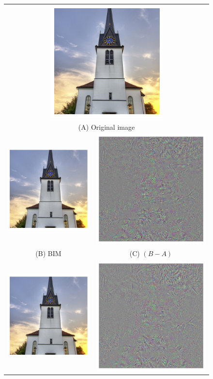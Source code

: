 \begin{figure}[htb]
    \centering
    \begin{tabular}{@{}cc@{}} \multicolumn{2}{c}{
            \includegraphics[width=.25\columnwidth]{Figures/related/attacks/original.png}
        }                       \\
        \multicolumn{2}{c}{ (A) Original image }
        \\
        \includegraphics[width=.32\columnwidth]{Figures/related/attacks/bim_1_chicken.png}
                &
        \includegraphics[width=.32\columnwidth]{Figures/related/attacks/bim_1_chicken_diff2.png}
        \\
        (B) BIM & (C) $(B - A)$ \\
        \includegraphics[width=.32\columnwidth]{Figures/related/attacks/ddn_0.85_chicken.png}
                &
        \includegraphics[width=.32\columnwidth]{Figures/related/attacks/ddn_0.85_chicken_diff2.png}

\end{tabular}
\end{figure}
